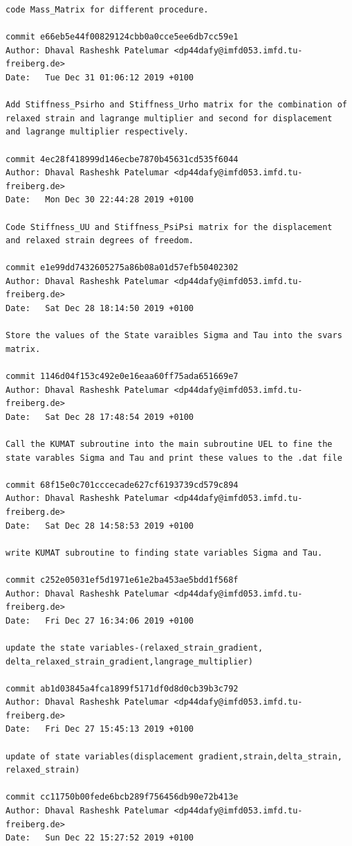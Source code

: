 \documentclass[12pt]{article}
\begin{document}
\begin{appendices}
\begin{verbatim}
code Mass_Matrix for different procedure.

commit e66eb5e44f00829124cbb0a0cce5ee6db7cc59e1
Author: Dhaval Rasheshk Patelumar <dp44dafy@imfd053.imfd.tu-freiberg.de>
Date:   Tue Dec 31 01:06:12 2019 +0100

Add Stiffness_Psirho and Stiffness_Urho matrix for the combination of 
relaxed strain and lagrange multiplier and second for displacement 
and lagrange multiplier respectively.

commit 4ec28f418999d146ecbe7870b45631cd535f6044
Author: Dhaval Rasheshk Patelumar <dp44dafy@imfd053.imfd.tu-freiberg.de>
Date:   Mon Dec 30 22:44:28 2019 +0100

Code Stiffness_UU and Stiffness_PsiPsi matrix for the displacement 
and relaxed strain degrees of freedom.

commit e1e99dd7432605275a86b08a01d57efb50402302
Author: Dhaval Rasheshk Patelumar <dp44dafy@imfd053.imfd.tu-freiberg.de>
Date:   Sat Dec 28 18:14:50 2019 +0100

Store the values of the State varaibles Sigma and Tau into the svars matrix.

commit 1146d04f153c492e0e16eaa60ff75ada651669e7
Author: Dhaval Rasheshk Patelumar <dp44dafy@imfd053.imfd.tu-freiberg.de>
Date:   Sat Dec 28 17:48:54 2019 +0100

Call the KUMAT subroutine into the main subroutine UEL to fine the 
state varables Sigma and Tau and print these values to the .dat file

commit 68f15e0c701cccecade627cf6193739cd579c894
Author: Dhaval Rasheshk Patelumar <dp44dafy@imfd053.imfd.tu-freiberg.de>
Date:   Sat Dec 28 14:58:53 2019 +0100

write KUMAT subroutine to finding state variables Sigma and Tau.

commit c252e05031ef5d1971e61e2ba453ae5bdd1f568f
Author: Dhaval Rasheshk Patelumar <dp44dafy@imfd053.imfd.tu-freiberg.de>
Date:   Fri Dec 27 16:34:06 2019 +0100

update the state variables-(relaxed_strain_gradient, 
delta_relaxed_strain_gradient,langrage_multiplier)

commit ab1d03845a4fca1899f5171df0d8d0cb39b3c792
Author: Dhaval Rasheshk Patelumar <dp44dafy@imfd053.imfd.tu-freiberg.de>
Date:   Fri Dec 27 15:45:13 2019 +0100

update of state variables(displacement gradient,strain,delta_strain,
relaxed_strain)

commit cc11750b00fede6bcb289f756456db90e72b413e
Author: Dhaval Rasheshk Patelumar <dp44dafy@imfd053.imfd.tu-freiberg.de>
Date:   Sun Dec 22 15:27:52 2019 +0100


\end{verbatim}
\end{appendices}
\end{document}
